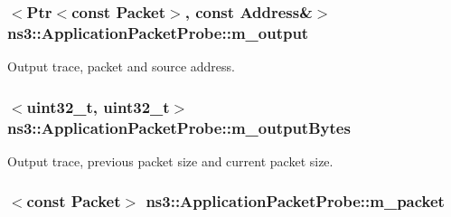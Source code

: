 \subsubsection[{\texorpdfstring{m\+\_\+output}{m_output}}]{$<${\bf Ptr}$<$const {\bf Packet}$>$, const {\bf Address}\&$>$ ns3\+::\+Application\+Packet\+Probe\+::m\+\_\+output\hspace{0.3cm}{\ttfamily [private]}}\hypertarget{classns3_1_1ApplicationPacketProbe_a99aa065d8b1a089f6e3b5fb51cd66f9c}{}\label{classns3_1_1ApplicationPacketProbe_a99aa065d8b1a089f6e3b5fb51cd66f9c}


Output trace, packet and source address. 

\subsubsection[{\texorpdfstring{m\+\_\+output\+Bytes}{m_outputBytes}}]{$<$uint32\+\_\+t, uint32\+\_\+t$>$ ns3\+::\+Application\+Packet\+Probe\+::m\+\_\+output\+Bytes\hspace{0.3cm}{\ttfamily [private]}}\hypertarget{classns3_1_1ApplicationPacketProbe_a900aa5c6f1cd3b0c0f25f534e0866853}{}\label{classns3_1_1ApplicationPacketProbe_a900aa5c6f1cd3b0c0f25f534e0866853}


Output trace, previous packet size and current packet size. 

\subsubsection[{\texorpdfstring{m\+\_\+packet}{m_packet}}]{$<$const {\bf Packet}$>$ ns3\+::\+Application\+Packet\+Probe\+::m\+\_\+packet\hspace{0.3cm}{\ttfamily [private]}}\hypertarget{classns3_1_1ApplicationPacketProbe_a1b1bc6d7801f9b5d0de89cc24d24edfb}{}\label{classns3_1_1ApplicationPacketProbe_a1b1bc6d7801f9b5d0de89cc24d24edfb}


